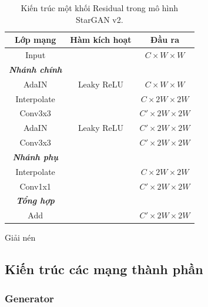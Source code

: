 \documentclass[12pt]{extreport}
\begin{document}
\begin{table}[H]
\begin{subtable}[H]{.48\textwidth}
        \begin{adjustbox}{width=\textwidth}
            \begin{tabular}{c c c}
                Lớp mạng    & Hàm kích hoạt & Đầu ra                      \\
                \hline
                Input       &               & $ C \times W \times W $     \\
                \hline
                \textbf{\textit{Nhánh chính}}                             \\
                AdaIN       & Leaky ReLU    & $ C \times W \times W $     \\
                Interpolate &               & $ C \times 2W  \times 2W $  \\
                Conv3x3     &               & $ C' \times 2W  \times 2W $ \\
                AdaIN       & Leaky ReLU    & $ C' \times 2W \times 2W $  \\
                Conv3x3     &               & $ C' \times 2W  \times 2W $ \\
                \hline
                \textbf{\textit{Nhánh phụ}}                               \\
                Interpolate &               & $ C \times 2W  \times 2W $  \\
                Conv1x1     &               & $ C' \times 2W  \times 2W $ \\
                \hline
                \textbf{\textit{Tổng hợp}}                                \\
                Add         &               & $ C' \times 2W  \times 2W $ \\
            \end{tabular}
        \end{adjustbox}
        \caption{Giải nén}
    \end{subtable}
    \caption{Kiến trúc một khối Residual trong mô hình StarGAN v2.}
\end{table}

\subsection{Kiến trúc các mạng thành phần}

\subsubsection{Generator}
\end{document}
